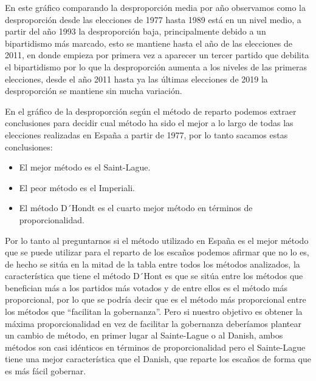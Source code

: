 \documentclass[12pt,a4paper,]{book}
\providecommand{\tightlist}{%
  \setlength{\itemsep}{0pt}\setlength{\parskip}{0pt}}
\numberwithin{dummy}{section}
\theoremstyle{ocrenumbox}
\theoremstyle{blacknumex}
\theoremstyle{blacknumbox}
\theoremstyle{ocrenum}
\theoremstyle{ocrenum}
\begin{document}
En este gráfico comparando la desproporción media por año observamos
como la desproporción desde las elecciones de 1977 hasta 1989 está en un
nivel medio, a partir del año 1993 la desproporción baja, principalmente
debido a un bipartidismo más marcado, esto se mantiene hasta el año de
las elecciones de 2011, en donde empieza por primera vez a aparecer un
tercer partido que debilita el bipartidismo por lo que la desproporción
aumenta a los niveles de las primeras elecciones, desde el año 2011
hasta ya las últimas elecciones de 2019 la desproporción se mantiene sin
mucha variación.

En el gráfico de la desproporción según el método de reparto podemos
extraer conclusiones para decidir cual método ha sido el mejor a lo
largo de todas las elecciones realizadas en España a partir de 1977, por
lo tanto sacamos estas conclusiones:

\begin{itemize}
\tightlist
\item
  El mejor método es el Saint-Lague.
\item
  El peor método es el Imperiali.
\item
  El método D´Hondt es el cuarto mejor método en términos de
  proporcionalidad.
\end{itemize}

Por lo tanto al preguntarnos si el método utilizado en España es el
mejor método que se puede utilizar para el reparto de los escaños
podemos afirmar que no lo es, de hecho se sitúa en la mitad de la tabla
entre todos los métodos analizados, la característica que tiene el
método D´Hont es que se sitúa entre los métodos que benefician más a los
partidos más votados y de entre ellos es el método más proporcional, por
lo que se podría decir que es el método más proporcional entre los
métodos que ``facilitan la gobernanza''. Pero si nuestro objetivo es
obtener la máxima proporcionalidad en vez de facilitar la gobernanza
deberíamos plantear un cambio de método, en primer lugar al Sainte-Lague
o al Danish, ambos métodos son casi idénticos en términos de
proporcionalidad pero el Sainte-Lague tiene una mejor característica que
el Danish, que reparte los escaños de forma que es más fácil gobernar.




\end{document}
